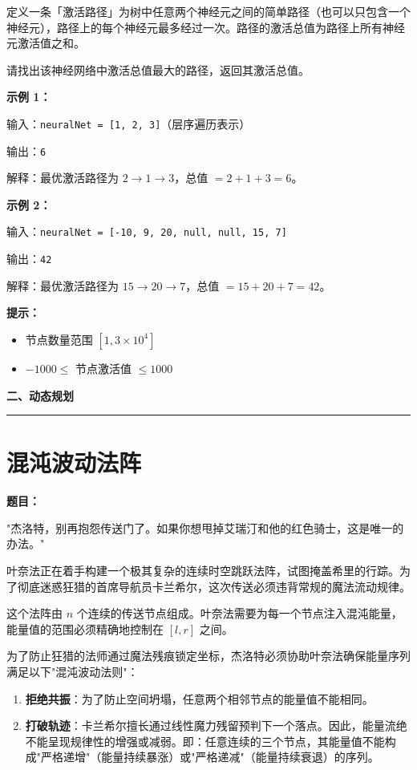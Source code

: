 \documentclass[12pt, a4paper]{article}
\newcommand{\category}[1]{%
  \vspace{1.2cm}
  {\noindent\Large\bfseries #1}
  \vspace{0.2em}\par
  \noindent\rule{\textwidth}{0.8pt}
  \vspace{0.2em}
}
\begin{document}
定义一条「激活路径」为树中任意两个神经元之间的简单路径（也可以只包含一个神经元），路径上的每个神经元最多经过一次。路径的激活总值为路径上所有神经元激活值之和。

请找出该神经网络中激活总值最大的路径，返回其激活总值。

\textbf{示例 1：}

输入：\texttt{neuralNet = [1, 2, 3]}（层序遍历表示）

输出：\texttt{6}

解释：最优激活路径为 $2 \to 1 \to 3$，总值 $= 2+1+3 = 6$。

\textbf{示例 2：}

输入：\texttt{neuralNet = [-10, 9, 20, null, null, 15, 7]}

输出：\texttt{42}

解释：最优激活路径为 $15 \to 20 \to 7$，总值 $= 15+20+7 = 42$。

\textbf{提示：}
\begin{itemize}[leftmargin=2em]
  \item 节点数量范围 $[1, 3 \times 10^4]$
  \item $-1000 \leq$ 节点激活值 $\leq 1000$
\end{itemize}



\category{二、动态规划}

\section{混沌波动法阵}

\noindent\textbf{题目：}

"杰洛特，别再抱怨传送门了。如果你想甩掉艾瑞汀和他的红色骑士，这是唯一的办法。"

叶奈法正在着手构建一个极其复杂的连续时空跳跃法阵，试图掩盖希里的行踪。为了彻底迷惑狂猎的首席导航员卡兰希尔，这次传送必须违背常规的魔法流动规律。

这个法阵由 $n$ 个连续的传送节点组成。叶奈法需要为每一个节点注入混沌能量，能量值的范围必须精确地控制在 $[l, r]$ 之间。

为了防止狂猎的法师通过魔法残痕锁定坐标，杰洛特必须协助叶奈法确保能量序列满足以下"混沌波动法则"：

\begin{enumerate}[leftmargin=2em]
  \item \textbf{拒绝共振}：为了防止空间坍塌，任意两个相邻节点的能量值不能相同。
  \item \textbf{打破轨迹}：卡兰希尔擅长通过线性魔力残留预判下一个落点。因此，能量流绝不能呈现规律性的增强或减弱。即：任意连续的三个节点，其能量值不能构成"严格递增"（能量持续暴涨）或"严格递减"（能量持续衰退）的序列。
\end{enumerate}
\end{document}
